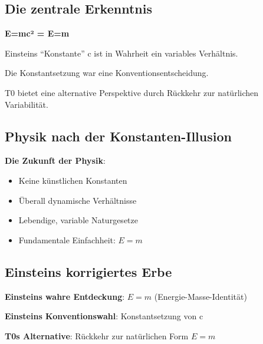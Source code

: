 	\subsection{Die zentrale Erkenntnis}
	
	\begin{tcolorbox}[colback=green!5!white,colframe=green!75!black,title=Die fundamentale Wahrheit]
		\textbf{E=mc² = E=m}
		
		Einsteins ``Konstante'' c ist in Wahrheit ein variables Verhältnis.
		
		Die Konstantsetzung war eine Konventionsentscheidung.
		
		T0 bietet eine alternative Perspektive durch Rückkehr zur natürlichen Variabilität.
	\end{tcolorbox}
	
	\subsection{Physik nach der Konstanten-Illusion}
	
	\textbf{Die Zukunft der Physik}:
	\begin{itemize}
		\item Keine künstlichen Konstanten
		\item Überall dynamische Verhältnisse
		\item Lebendige, variable Naturgesetze
		\item Fundamentale Einfachheit: $E = m$
	\end{itemize}
	
	\subsection{Einsteins korrigiertes Erbe}
	
	\textbf{Einsteins wahre Entdeckung}: $E = m$ (Energie-Masse-Identität)
	
	\textbf{Einsteins Konventionswahl}: Konstantsetzung von c
	
	\textbf{T0s Alternative}: Rückkehr zur natürlichen Form $E = m$
	

